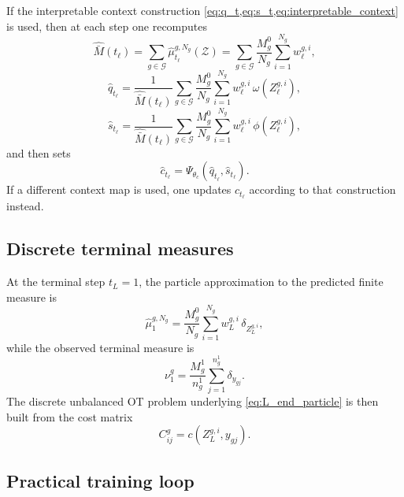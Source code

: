 \documentclass[11pt]{article}
\newcommand{\Gcal}{\mathcal{G}}
\newcommand{\Zcal}{\mathcal{Z}}
\begin{document}
If the interpretable context construction \cref{eq:q_t,eq:s_t,eq:interpretable_context} is used, then at each step one recomputes
\begin{equation}
\hat{\bar M}(t_\ell)
=
\sum_{g\in\Gcal}
\hat\mu_{t_\ell}^{g,N_g}(\Zcal)
=
\sum_{g\in\Gcal}
\frac{M_g^0}{N_g}\sum_{i=1}^{N_g} w_\ell^{g,i},
\label{eq:discrete_total_mass}
\end{equation}
\begin{equation}
\hat q_{t_\ell}
=
\frac{1}{\hat{\bar M}(t_\ell)}
\sum_{g\in\Gcal}
\frac{M_g^0}{N_g}
\sum_{i=1}^{N_g}
w_\ell^{g,i}\,\omega(Z_\ell^{g,i}),
\label{eq:discrete_q}
\end{equation}
\begin{equation}
\hat s_{t_\ell}
=
\frac{1}{\hat{\bar M}(t_\ell)}
\sum_{g\in\Gcal}
\frac{M_g^0}{N_g}
\sum_{i=1}^{N_g}
w_\ell^{g,i}\,\phi(Z_\ell^{g,i}),
\label{eq:discrete_s}
\end{equation}
and then sets
\begin{equation}
\hat c_{t_\ell}=\Psi_{\theta_c}(\hat q_{t_\ell},\hat s_{t_\ell}).
\label{eq:discrete_c}
\end{equation}
If a different context map is used, one updates $\hat c_{t_\ell}$ according to that construction instead.

\subsection{Discrete terminal measures}

At the terminal step $t_L=1$, the particle approximation to the predicted finite measure is
\begin{equation}
\hat\mu_1^{g,N_g}
=
\frac{M_g^0}{N_g}
\sum_{i=1}^{N_g}
w_L^{g,i}\,\delta_{Z_L^{g,i}},
\label{eq:mu_terminal_discrete}
\end{equation}
while the observed terminal measure is
\begin{equation}
\nu_1^g
=
\frac{M_g^1}{n_g^1}
\sum_{j=1}^{n_g^1}\delta_{y_{gj}}.
\label{eq:nu_terminal_discrete}
\end{equation}
The discrete unbalanced OT problem underlying \cref{eq:L_end_particle} is then built from the cost matrix
\[
C_{ij}^g = c(Z_L^{g,i},y_{gj}).
\]

\subsection{Practical training loop}
\end{document}
